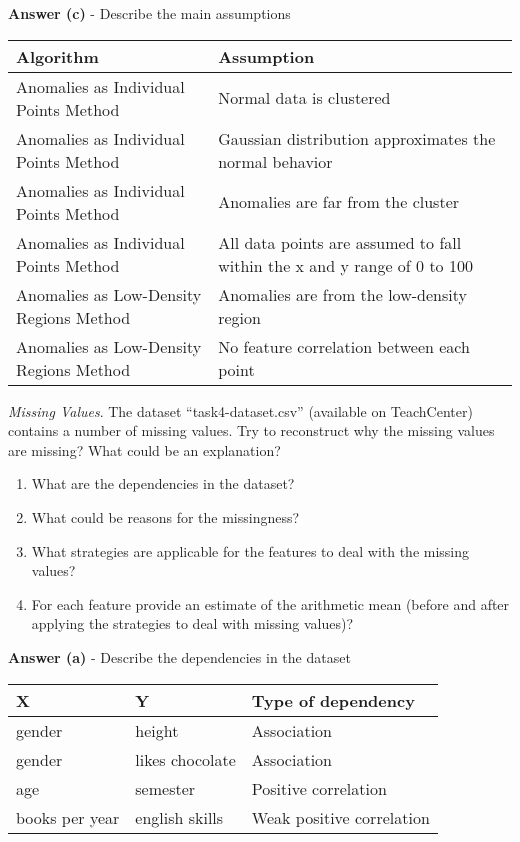\documentclass[a4paper,10pt]{article}\setlength{\textheight}{10in}\setlength{\textwidth}{6.5in}\setlength{\topmargin}{-0.125in}\setlength{\oddsidemargin}{-.2in}\setlength{\evensidemargin}{-.2in}\setlength{\headsep}{0.2in}\setlength{\footskip}{0pt}\usepackage{amsmath}\usepackage{fancyhdr}\usepackage{enumitem}\usepackage{hyperref}\usepackage{xcolor}\usepackage{graphicx}\usepackage[export]{adjustbox}\usepackage{caption}\usepackage{float}\usepackage{booktabs}\usepackage{makecell}\pagestyle{fancy}
\begin{document}
\begin{enumerate}[topsep=0mm, partopsep=0mm, leftmargin=*]
\textbf{Answer (c)} - Describe the main assumptions \\
\begin{center}
\begin{tabular}{ll}
\toprule
\textbf{Algorithm} & \textbf{Assumption} \\ \midrule
Anomalies as Individual Points Method & Normal data is clustered \\
Anomalies as Individual Points Method & Gaussian distribution approximates the normal behavior\\
Anomalies as Individual Points Method & Anomalies are far from the cluster \\ 
Anomalies as Individual Points Method & All data points are assumed to fall within the x and y range of 0 to 100 \\
Anomalies as Low-Density Regions Method & Anomalies are from the low-density region \\
Anomalies as Low-Density Regions Method & No feature correlation between each point \\ 
\bottomrule
\end{tabular}
\end{center}





{\color{blue}
\clearpage\item\textit{Missing Values}. The dataset ``task4-dataset.csv'' (available on TeachCenter) contains a number of missing values. Try to reconstruct why the missing values are missing? What could be an explanation?
\begin{enumerate}
	\item What are the dependencies in the dataset?
	\item What could be reasons for the missingness?
	\item What strategies are applicable for the features to deal with the missing values?
	\item For each feature provide an estimate of the arithmetic mean (before and after applying the strategies to deal with missing values)?
\end{enumerate}
}

\textbf{Answer (a)} - Describe the dependencies in the dataset
\begin{center}
\begin{tabular}{lll}
\toprule
\textbf{X} & \textbf{Y} & \textbf{Type of dependency} \\ \midrule
gender & height & Association \\
gender & likes chocolate & Association \\
age & semester & Positive correlation \\
books per year & english skills & Weak positive correlation \\
\bottomrule
\end{tabular}
\end{center}


\end{enumerate}
\end{document}
